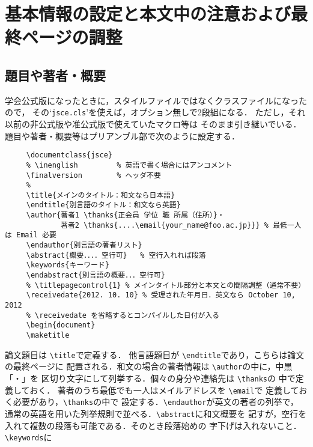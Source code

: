\documentclass[dvipdfmx,onecolumn]{jsce}  %
\begin{document}
\section{基本情報の設定と本文中の注意および最終ページの調整}
\label{sec:2}

\subsection{題目や著者・概要}

学会公式版になったときに，スタイルファイルではなくクラスファイルになったので，
その`{\tt jsce.cls}'を使えば，オプション無しで2段組になる．
ただし，それ以前の非公式版や准公式版で使えていたマクロ等は
そのまま引き継いでいる．
題目や著者・概要等はプリアンブル部で次のように設定する．

\renewcommand{\baselinestretch}{0.75}\small\normalsize
\begin{verbatim}
     \documentclass{jsce}
     % \inenglish         % 英語で書く場合にはアンコメント
     \finalversion        % ヘッダ不要
     %
     \title{メインのタイトル：和文なら日本語}
     \endtitle{別言語のタイトル：和文なら英語}
     \author{著者1 \thanks{正会員 学位 職 所属（住所）}・
             著者2 \thanks{....\email{your_name@foo.ac.jp}}} % 最低一人は Email 必要
     \endauthor{別言語の著者リスト}
     \abstract{概要．．．．空行可}   % 空行入れれば段落
     \keywords{キーワード}
     \endabstract{別言語の概要．．．空行可}
     % \titlepagecontrol{1} % メインタイトル部分と本文との間隔調整（通常不要）
     \receivedate{2012. 10. 10} % 受理された年月日．英文なら October 10, 2012
     % \receivedate を省略するとコンパイルした日付が入る
     \begin{document}
     \maketitle
\end{verbatim}
\renewcommand{\baselinestretch}{1}\small\normalsize
%
論文題目は \verb+\title+で定義する．
他言語題目が \verb+\endtitle+であり，こちらは論文の最終ページに
配置される．和文の場合の著者情報は \verb+\author+の中に，中黒「・」を
区切り文字にして列挙する．個々の身分や連絡先は \verb+\thanks+の
中で定義しておく．
著者のうち最低でも一人はメイルアドレスを \verb+\email+で
定義しておく必要があり，\verb+\thanks+の中で
設定する．\verb+\endauthor+が英文の著者の列挙で，
通常の英語を用いた列挙規則で並べる．\verb+\abstract+に和文概要を
記すが，空行を入れて複数の段落も可能である．そのとき段落始めの
字下げは入れないこと．\verb+\keywords+に
\end{document}
